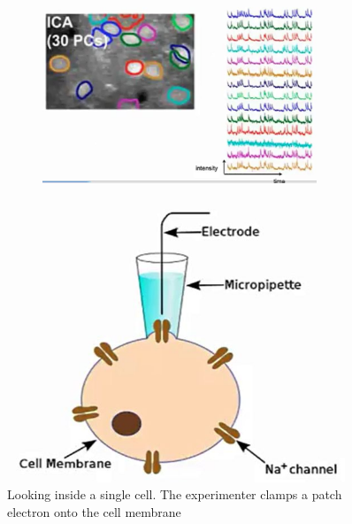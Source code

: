 \documentclass[]{article}
\begin{document}
\begin{figure}[H]
\begin{subfigure}[b]{0.3\textwidth}
	\end{subfigure}
	\begin{subfigure}[b]{\textwidth}
		\caption{}\label{fig:rb6}
		\includegraphics[width=0.9\textwidth]{calcium-imaging}
	\end{subfigure}
\end{figure}

\begin{figure}[H]
	\begin{center}
		\caption[Looking inside a single cell]{Looking inside a single cell. The experimenter clamps a patch electron onto the cell membrane}
		\includegraphics[width=0.9\textwidth]{looking-inside}
	\end{center}
\end{figure}
\end{document}
